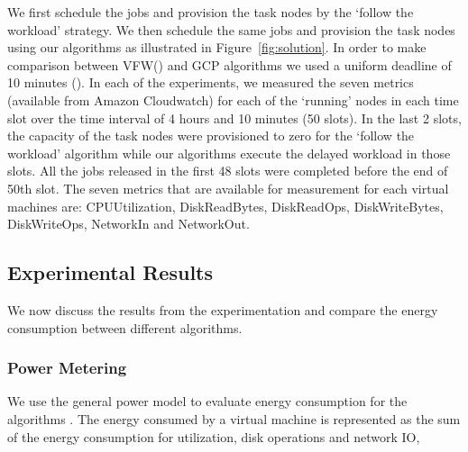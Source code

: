 \documentclass[10pt,conference,compsocconf,letterpaper]{IEEEtran}
\begin{document}
We first schedule the jobs and provision the task nodes by the `follow the workload' strategy. We then schedule the same jobs and provision the task nodes using our algorithms as illustrated in Figure~\ref{fig:solution}. In order to make comparison between VFW() and GCP algorithms we used a uniform deadline of 10 minutes (). In each of the experiments, we measured the seven metrics (available from Amazon Cloudwatch) for each of the `running' nodes in each time slot over the time interval of 4 hours and 10 minutes (50 slots). In the last 2 slots, the capacity of the task nodes were provisioned to zero for the `follow the workload' algorithm while our algorithms execute the delayed workload in those slots. All the jobs released in the first 48 slots were completed before the end of 50th slot. The seven metrics that are available for measurement for each virtual machines are: CPUUtilization, DiskReadBytes, DiskReadOps, DiskWriteBytes, DiskWriteOps, NetworkIn and NetworkOut.







\begin{figure*}[!t]
\centerline{
\hfil
{}
\hfil
{}
}
\caption{The solutions for (a) Follow the workload, (b) VFW() and (c) GCP-U algorithms with uniform deadline  slots,  and time slot = 5 mins.}
\label{fig:solution}
\end{figure*}










\subsection{Experimental Results}
We now discuss the results from the experimentation and compare the energy consumption between different algorithms.




\subsubsection*{Power Metering}
We use the general power model to evaluate energy consumption for the algorithms \cite{n7,n8}. The energy consumed by a virtual machine is represented as the sum of the energy consumption for utilization, disk operations and network IO,
\end{document}
